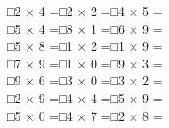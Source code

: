 \documentclass[uplatex,
paper=a4,
fontsize=18pt,
jafontsize=16pt,
number_of_lines=30,
line_length=30zh,
baselineskip=25pt,
]{jlreq}
\begin{document}
□\hspace{1em}2 × 4 =\hspace{3em}□\hspace{1em}2 × 2 =\hspace{3em}□\hspace{1em}4 × 5 =\hspace{3em}
\\

□\hspace{1em}5 × 4 =\hspace{3em}□\hspace{1em}8 × 1 =\hspace{3em}□\hspace{1em}6 × 9 =\hspace{3em}
\\

□\hspace{1em}5 × 8 =\hspace{3em}□\hspace{1em}1 × 2 =\hspace{3em}□\hspace{1em}1 × 9 =\hspace{3em}
\\

□\hspace{1em}7 × 9 =\hspace{3em}□\hspace{1em}1 × 0 =\hspace{3em}□\hspace{1em}9 × 3 =\hspace{3em}
\\

□\hspace{1em}9 × 6 =\hspace{3em}□\hspace{1em}3 × 0 =\hspace{3em}□\hspace{1em}3 × 2 =\hspace{3em}
\\

□\hspace{1em}2 × 9 =\hspace{3em}□\hspace{1em}4 × 4 =\hspace{3em}□\hspace{1em}5 × 9 =\hspace{3em}
\\

□\hspace{1em}5 × 0 =\hspace{3em}□\hspace{1em}4 × 7 =\hspace{3em}□\hspace{1em}2 × 8 =\hspace{3em}
\\
\end{document}
